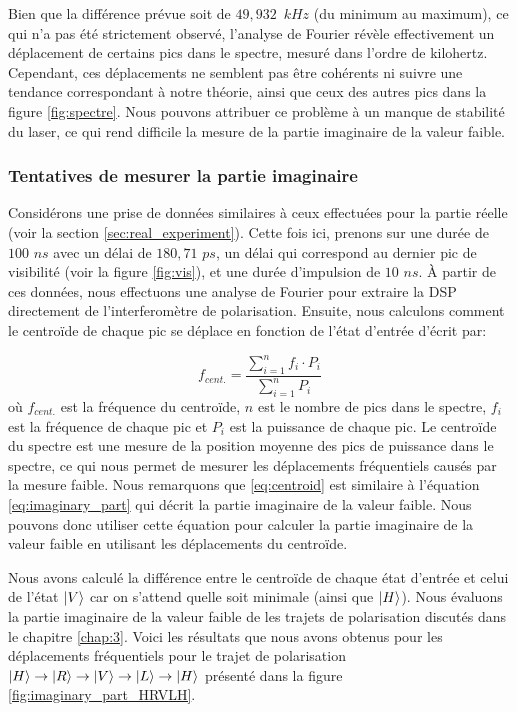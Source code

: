 \begin{onehalfspace}
    \noindent Bien que la différence prévue soit de $49,932$ $kHz$ (du minimum au maximum), ce qui 
    n’a pas été strictement observé, l’analyse de Fourier révèle 
    effectivement un déplacement de certains pics dans le spectre, 
    mesuré dans l'ordre de kilohertz. Cependant, ces déplacements ne 
    semblent pas être cohérents ni suivre une tendance correspondant à 
    notre théorie, ainsi que ceux des autres pics dans la figure \ref{fig:spectre}.
    Nous pouvons attribuer ce problème à un manque de stabilité
    du laser, ce qui rend difficile la mesure de la partie 
    imaginaire de la valeur faible.

    \subsubsection{Tentatives de mesurer la partie imaginaire}

     Considérons une prise de données similaires
    à ceux effectuées pour la partie réelle (voir la section \ref{sec:real_experiment}). 
    Cette fois ici, prenons sur une 
    durée de $100$ $ns$ avec un délai de $180,71$ $ps$, un délai 
    qui correspond au dernier pic de visibilité (voir la figure \ref{fig:vis}), 
    et une durée d'impulsion de $10$ $ns$. À partir de ces données, nous effectuons
    une analyse de Fourier pour extraire la DSP directement de 
    l'interferomètre de polarisation. Ensuite, nous calculons comment le
    centroïde de chaque pic se déplace en fonction de l'état
    d'entrée d'écrit par:

    \begin{equation}
        f_{cent.} = \frac{\sum_{i=1}^{n} f_i \cdot P_i}{\sum_{i=1}^{n} P_i}
        \label{eq:centroid}
    \end{equation}
    \noindent où $f_{cent.}$ est la fréquence du centroïde, $n$ est le
    nombre de pics dans le spectre, $f_i$ est la fréquence de chaque pic 
    et $P_i$ est la puissance
    de chaque pic. 
    Le centroïde du spectre est une mesure de la position moyenne des pics
    de puissance dans le spectre, ce qui nous permet de mesurer les
    déplacements fréquentiels causés par la mesure faible.
    Nous remarquons que \ref{eq:centroid} est similaire à l'équation \ref{eq:imaginary_part}
    qui décrit la partie imaginaire de la valeur faible.
    Nous pouvons donc utiliser cette équation pour calculer
    la partie imaginaire de la valeur faible en utilisant les déplacements
    du centroïde. 
    
    \noindent Nous avons calculé la différence entre le
    centroïde de chaque état d'entrée et celui de l'état $\ket{V}$
    car on s'attend quelle soit minimale (ainsi que $\ket{H}$).
    Nous évaluons la partie imaginaire de la valeur faible de les
    trajets de polarisation discutés dans le chapitre \ref{chap:3}. Voici les
    résultats que nous avons obtenus pour les déplacements fréquentiels
    pour le trajet de polarisation $\ket{H} \to \ket{R} \to \ket{V} \to \ket{L} \to \ket{H}$
    présenté dans la figure \ref{fig:imaginary_part_HRVLH}.


\end{onehalfspace}
